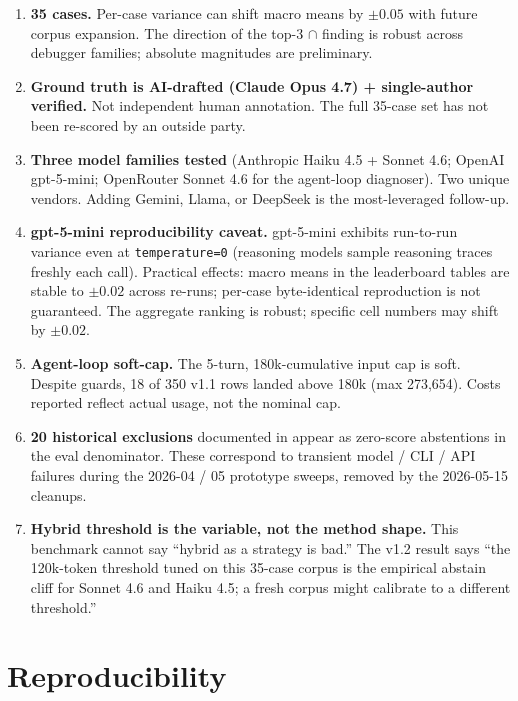 \documentclass{article}
\begin{document}
\begin{enumerate}
  \item \textbf{35 cases.} Per-case variance can shift macro means by
  $\pm 0.05$ with future corpus expansion. The direction of the
  top-3 $\cap$ finding is robust across debugger families; absolute
  magnitudes are preliminary.
  \item \textbf{Ground truth is AI-drafted (Claude Opus 4.7) +
  single-author verified.} Not independent human annotation. The
  full 35-case set has not been re-scored by an outside party.
  \item \textbf{Three model families tested} (Anthropic Haiku 4.5 +
  Sonnet 4.6; OpenAI gpt-5-mini; OpenRouter Sonnet 4.6 for the
  agent-loop diagnoser). Two unique vendors. Adding Gemini, Llama,
  or DeepSeek is the most-leveraged follow-up.
  \item \textbf{gpt-5-mini reproducibility caveat.} gpt-5-mini
  exhibits run-to-run variance even at \texttt{temperature=0}
  (reasoning models sample reasoning traces freshly each call).
  Practical effects: macro means in the leaderboard tables are
  stable to $\pm 0.02$ across re-runs; per-case byte-identical
  reproduction is not guaranteed. The aggregate ranking is robust;
  specific cell numbers may shift by $\pm 0.02$.
  \item \textbf{Agent-loop soft-cap.} The 5-turn, 180k-cumulative
  input cap is soft. Despite guards, 18 of 350 v1.1 rows landed
  above 180k (max 273{,}654). Costs reported reflect actual usage,
  not the nominal cap.
  \item \textbf{20 historical exclusions} documented in
  appear as zero-score abstentions in the eval denominator. These
  correspond to transient model / CLI / API failures during the
  2026-04 / 05 prototype sweeps, removed by the 2026-05-15 cleanups.
  \item \textbf{Hybrid threshold is the variable, not the method
  shape.} This benchmark cannot say ``hybrid as a strategy is bad.''
  The v1.2 result says ``the 120k-token threshold tuned on this
  35-case corpus is the empirical abstain cliff for Sonnet 4.6 and
  Haiku 4.5; a fresh corpus might calibrate to a different
  threshold.''
\end{enumerate}

\section{Reproducibility}
\end{document}
